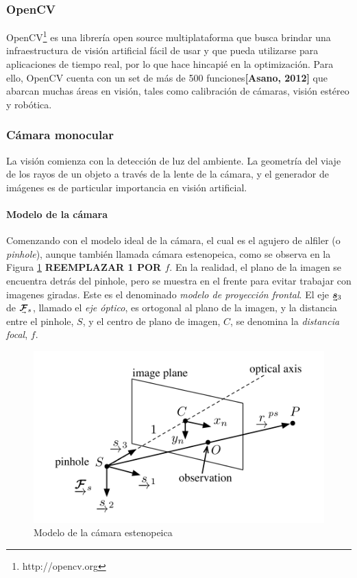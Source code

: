 \subsubsection{OpenCV}
OpenCV\footnote{http://opencv.org} es una librería open source multiplataforma que busca brindar una infraestructura de visión artificial fácil de usar y que pueda utilizarse para aplicaciones de tiempo real, por lo que hace hincapié en la optimización. Para ello, OpenCV cuenta con un set de más de 500 funciones\textbf{[Asano, 2012]} que abarcan muchas áreas en visión, tales como calibración de cámaras, visión estéreo y robótica.

\subsubsection{Cámara monocular}
La visión comienza con la detección de luz del ambiente. La geometría del viaje de los rayos de un objeto a través de la lente de la cámara, y el generador de imágenes es de particular importancia en visión artificial.


\paragraph{Modelo de la cámara}
Comenzando con el modelo ideal de la cámara, el cual es el agujero de alfiler (o \textit{pinhole}), aunque también llamada cámara estenopeica, como se observa en la Figura \ref{fig:pinholecamera} \textbf{REEMPLAZAR 1 POR $f$}. En la realidad, el plano de la imagen se encuentra detrás del pinhole, pero se muestra en el frente para evitar trabajar con imagenes giradas. Este es el denominado \textit{modelo de proyección frontal}. El eje $\undervec{\bm{s}}_3$ de $\undervec{\bm{\mathcal{F}}}_s$, llamado el \textit{eje 
óptico}, es ortogonal al plano de la imagen, y la distancia entre el pinhole, $S$, y el centro de plano de imagen, $C$,  se denomina la \textit{distancia focal}, $f$.
\begin{figure}
    \centering
    \includegraphics[width=\textwidth]{Img/PinholeCamera.png}
    \caption{Modelo de la cámara estenopeica}
    \label{fig:pinholecamera}
\end{figure}

